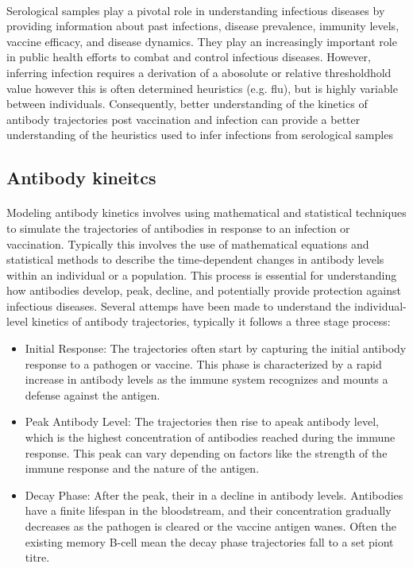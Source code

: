 \documentclass{article}
\begin{document}
\paragraph{}Serological samples play a pivotal role in understanding infectious diseases by providing information about past infections, disease prevalence, immunity levels, vaccine efficacy, and disease dynamics. They play an increasingly important role in public health efforts to combat and control infectious diseases. However, inferring infection requires a derivation of a abosolute or relative thresholdhold value however this is often determined heuristics (e.g. flu), but is highly variable between individuals. Consequently, better understanding of the kinetics of antibody trajectories post vaccination and infection can provide a better understanding of the heuristics used to infer infections from serological samples

\subsection{Antibody kineitcs}

\paragraph{}Modeling antibody kinetics involves using mathematical and statistical techniques to simulate the trajectories of antibodies in response to an infection or vaccination. Typically this involves the use of mathematical equations and statistical methods to describe the time-dependent changes in antibody levels within an individual or a population. This process is essential for understanding how antibodies develop, peak, decline, and potentially provide protection against infectious diseases. Several attemps have been made to understand the individual-level kinetics of antibody trajectories, typically it follows a three stage process:

\begin{itemize}
\item Initial Response: The trajectories often start by capturing the initial antibody response to a pathogen or vaccine. This phase is characterized by a rapid increase in antibody levels as the immune system recognizes and mounts a defense against the antigen.

\item Peak Antibody Level: The trajectories then rise to apeak antibody level, which is the highest concentration of antibodies reached during the immune response. This peak can vary depending on factors like the strength of the immune response and the nature of the antigen.

\item Decay Phase: After the peak, their in a decline in antibody levels. Antibodies have a finite lifespan in the bloodstream, and their concentration gradually decreases as the pathogen is cleared or the vaccine antigen wanes. Often the existing memory B-cell mean the decay phase trajectories fall to a set piont titre.
\end{itemize}
\end{document}
